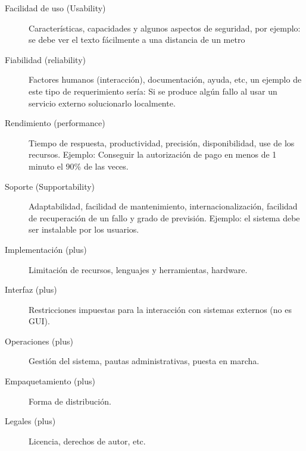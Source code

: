 \documentclass[11pt]{article}
\begin{document}
\begin{description}
\item[{Facilidad de uso (Usability)}] Características, capacidades y algunos aspectos de seguridad, por ejemplo: se debe ver el texto fácilmente a una distancia de un metro

\item[{Fiabilidad (reliability)}] Factores humanos (interacción), documentación, ayuda, etc, un ejemplo de este tipo de requerimiento sería: Si se produce algún fallo al usar un servicio externo solucionarlo localmente.

\item[{Rendimiento (performance)}] Tiempo de respuesta, productividad, precisión, disponibilidad, use de los recursos. Ejemplo: Conseguir la autorización de pago en menos de 1 minuto el 90\% de las veces.

\item[{Soporte (Supportability)}] Adaptabilidad, facilidad de mantenimiento, internacionalización, facilidad de recuperación de un fallo y grado de previsión. Ejemplo: el sistema debe ser instalable por los usuarios.

\item[{Implementación (plus)}] Limitación de recursos, lenguajes y herramientas, hardware.

\item[{Interfaz (plus)}] Restricciones impuestas para la interacción con sistemas externos (no es GUI).

\item[{Operaciones (plus)}] Gestión del sistema, pautas administrativas, puesta en marcha.

\item[{Empaquetamiento (plus)}] Forma de distribución.

\item[{Legales (plus)}] Licencia, derechos de autor, etc.
\end{description}
\end{document}
